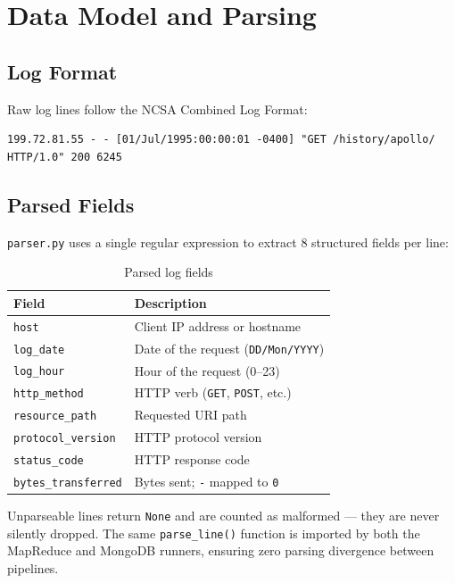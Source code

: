 \documentclass[12pt,a4paper]{article}
\begin{document}
\section{Data Model and Parsing}

\subsection{Log Format}

Raw log lines follow the NCSA Combined Log Format:

\begin{lstlisting}
199.72.81.55 - - [01/Jul/1995:00:00:01 -0400] "GET /history/apollo/ HTTP/1.0" 200 6245
\end{lstlisting}

\subsection{Parsed Fields}

\texttt{parser.py} uses a single regular expression to extract 8 structured fields per line:

\begin{table}[h!]
\centering
\begin{tabularx}{\textwidth}{lX}
\toprule
Field & Description \\
\midrule
\texttt{host}              & Client IP address or hostname \\
\texttt{log\_date}         & Date of the request (\texttt{DD/Mon/YYYY}) \\
\texttt{log\_hour}         & Hour of the request (0--23) \\
\texttt{http\_method}      & HTTP verb (\texttt{GET}, \texttt{POST}, etc.) \\
\texttt{resource\_path}    & Requested URI path \\
\texttt{protocol\_version} & HTTP protocol version \\
\texttt{status\_code}      & HTTP response code \\
\texttt{bytes\_transferred}& Bytes sent; \texttt{-} mapped to \texttt{0} \\
\bottomrule
\end{tabularx}
\caption{Parsed log fields}
\end{table}

Unparseable lines return \texttt{None} and are counted as malformed --- they are never silently
dropped. The same \texttt{parse\_line()} function is imported by both the MapReduce and MongoDB
runners, ensuring zero parsing divergence between pipelines.
\end{document}
